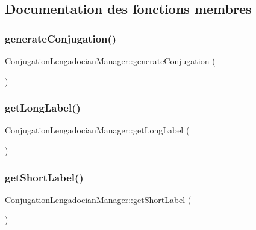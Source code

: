 \subsection{Documentation des fonctions membres}
\hypertarget{class_conjugation_lengadocian_manager_aaa61dfc0043e13de40d77255494cba82}{}\label{class_conjugation_lengadocian_manager_aaa61dfc0043e13de40d77255494cba82} 
\subsubsection{\texorpdfstring{generate\+Conjugation()}{generateConjugation()}}
{\footnotesize\ttfamily Conjugation\+Lengadocian\+Manager\+::generate\+Conjugation (\begin{DoxyParamCaption}{ }\end{DoxyParamCaption})}

\hypertarget{class_conjugation_lengadocian_manager_ac14ff4edd45b3de2d303f2ac5fc94d91}{}\label{class_conjugation_lengadocian_manager_ac14ff4edd45b3de2d303f2ac5fc94d91} 
\subsubsection{\texorpdfstring{get\+Long\+Label()}{getLongLabel()}}
{\footnotesize\ttfamily Conjugation\+Lengadocian\+Manager\+::get\+Long\+Label (\begin{DoxyParamCaption}{ }\end{DoxyParamCaption})}

\hypertarget{class_conjugation_lengadocian_manager_a87ad1195fe8eea002079c372843bb9fa}{}\label{class_conjugation_lengadocian_manager_a87ad1195fe8eea002079c372843bb9fa} 
\subsubsection{\texorpdfstring{get\+Short\+Label()}{getShortLabel()}}
{\footnotesize\ttfamily Conjugation\+Lengadocian\+Manager\+::get\+Short\+Label (\begin{DoxyParamCaption}{ }\end{DoxyParamCaption})}

